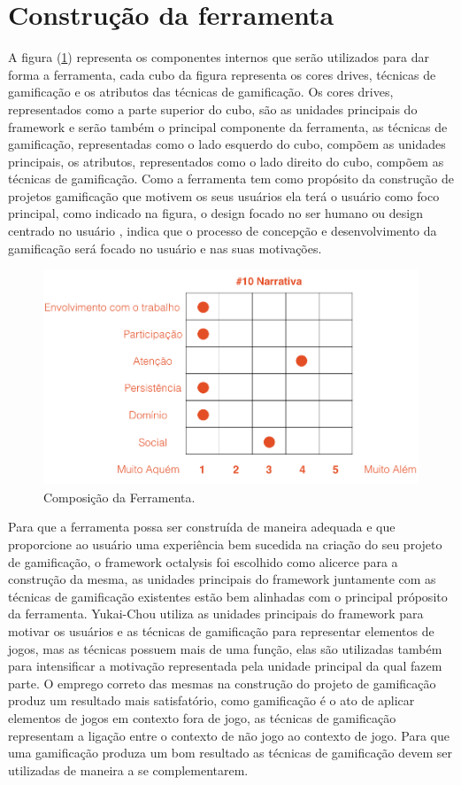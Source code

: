 \section{Construção da ferramenta}
A figura (\ref{fig01}) representa os componentes internos que serão utilizados para dar forma a ferramenta, cada cubo da figura representa os cores drives, técnicas de gamificação e os atributos das técnicas de gamificação. Os cores drives, representados como a parte superior do cubo, são as unidades principais do framework e serão também o principal componente da ferramenta, as técnicas de gamificação, representadas como o lado esquerdo do cubo, compõem as unidades principais, os atributos, representados como o lado direito do cubo, compõem as técnicas de gamificação. Como a ferramenta tem como propósito da construção de projetos gamificação que motivem os seus usuários ela terá o usuário como foco principal, como indicado na figura, o design focado no ser humano \cite{chou2015actionable} ou design centrado no usuário \cite{kumar2013gamification}, indica que o processo de concepção e desenvolvimento da gamificação será focado no usuário e nas suas motivações. 


\begin{figure}[h]
	\centering
		\includegraphics[keepaspectratio=true,scale=0.5]{figuras/notas.png}
	\caption{Composição da Ferramenta.\label{fig01}}
\end{figure}

Para que a ferramenta possa ser construída de maneira adequada e que proporcione ao usuário uma experiência bem sucedida na criação do seu projeto de gamificação, o framework octalysis foi escolhido como alicerce para a construção da mesma, as unidades principais do framework juntamente com as técnicas de gamificação existentes estão bem alinhadas com o principal próposito da ferramenta. Yukai-Chou utiliza as unidades principais do framework para motivar os usuários e as técnicas de gamificação para representar elementos de jogos, mas as técnicas possuem mais de uma função, elas são utilizadas também para intensificar a motivação representada pela unidade principal da qual fazem parte. O emprego correto das mesmas na construção do projeto de gamificação produz um resultado mais satisfatório, como gamificação é o ato de aplicar elementos de jogos em contexto fora de jogo, as técnicas de gamificação representam a ligação entre o contexto de não jogo ao contexto de jogo. Para que uma gamificação produza um bom resultado as técnicas de gamificação devem ser utilizadas de maneira a se complementarem.


